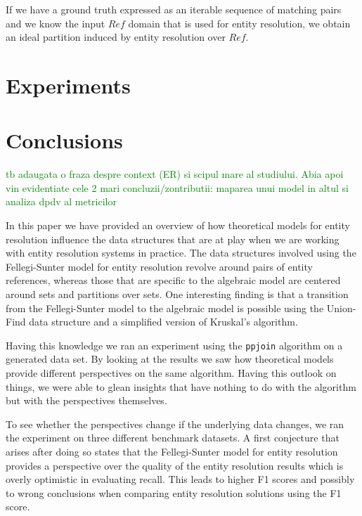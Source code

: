 \documentclass[journal]{IEEEtran}
\begin{document}
    If we have a ground truth expressed as an iterable sequence of matching
    pairs and we know the input $Ref$ domain that is used for entity resolution,
    we obtain an ideal partition induced by entity resolution over $Ref$.
    
    \section{Experiments}\label{sec:experiments}
    

    \section[conclusion]{Conclusions}\label{sec:conclusions}

    \textcolor{green}{tb adaugata o fraza despre context (ER) si scipul mare al studiului. Abia apoi vin evidentiate cele 2 mari concluzii/zontributii: maparea unui model in altul si analiza dpdv al metricilor}

    In this paper we have provided an overview of how theoretical models for
    entity resolution influence the data structures that are at play when we are
    working with entity resolution systems in practice.
    The data structures involved using the Fellegi-Sunter model for entity
    resolution revolve around pairs of entity references, whereas those that
    are specific to the algebraic model are centered around sets and partitions
    over sets.
    One interesting finding is that a transition from the Fellegi-Sunter model
    to the algebraic model is possible using the Union-Find data structure and
    a simplified version of Kruskal's algorithm.

    Having this knowledge we ran an experiment using the \texttt{ppjoin}
    algorithm on a generated data set.
    By looking at the results we saw how theoretical models provide different
    perspectives on the same algorithm.
    Having this outlook on things, we were able to glean insights that have
    nothing to do with the algorithm but with the perspectives themselves.

    To see whether the perspectives change if the underlying data changes, we
    ran the experiment on three different benchmark datasets.
    A first conjecture that arises after doing so states that the Fellegi-Sunter
    model for entity resolution provides a perspective over the quality of the
    entity resolution results which is overly optimistic in evaluating recall.
    This leads to higher F1 scores and possibly to wrong conclusions when
    comparing entity resolution solutions using the F1 score.
\end{document}
